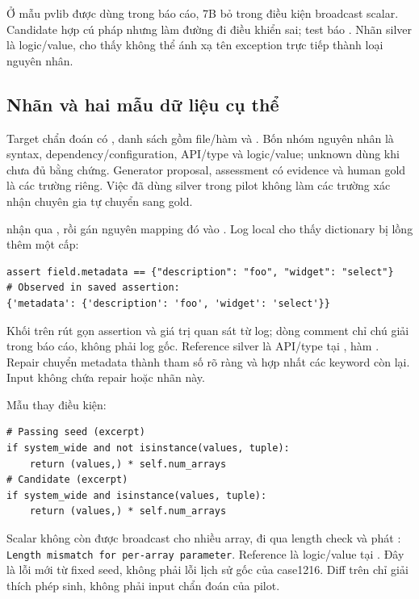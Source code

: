 \documentclass[12pt,a4paper]{article}
\begin{document}
Ở mẫu pvlib được dùng trong báo cáo, 7B bỏ  trong điều kiện broadcast scalar. Candidate hợp cú pháp nhưng làm đường đi điều khiển sai; test báo . Nhãn silver là logic/value, cho thấy không thể ánh xạ tên exception trực tiếp thành loại nguyên nhân.

\nextpage
\subsection{Nhãn và hai mẫu dữ liệu cụ thể}
Target chẩn đoán có , danh sách  gồm file/hàm và . Bốn nhóm nguyên nhân là syntax, dependency/configuration, API/type và logic/value; unknown dùng khi chưa đủ bằng chứng. Generator proposal, assessment có evidence và human gold là các trường riêng. Việc đã dùng silver trong pilot không làm các trường xác nhận chuyên gia tự chuyển sang gold.

 nhận  qua , rồi gán nguyên mapping đó vào . Log local cho thấy dictionary bị lồng thêm một cấp:
\begin{Verbatim}[fontsize=\footnotesize]
assert field.metadata == {"description": "foo", "widget": "select"}
# Observed in saved assertion:
{'metadata': {'description': 'foo', 'widget': 'select'}}
\end{Verbatim}
Khối trên rút gọn assertion và giá trị quan sát từ log; dòng comment chỉ chú giải trong báo cáo, không phải log gốc. Reference silver là API/type tại , hàm . Repair chuyển metadata thành tham số rõ ràng và hợp nhất các keyword còn lại. Input không chứa repair hoặc nhãn này.

Mẫu  thay điều kiện:
\begin{Verbatim}[fontsize=\small]
# Passing seed (excerpt)
if system_wide and not isinstance(values, tuple):
    return (values,) * self.num_arrays
# Candidate (excerpt)
if system_wide and isinstance(values, tuple):
    return (values,) * self.num_arrays
\end{Verbatim}
Scalar không còn được broadcast cho nhiều array, đi qua length check và phát : \texttt{Length mismatch for per-array parameter}. Reference là logic/value tại . Đây là lỗi mới từ fixed seed, không phải lỗi lịch sử gốc của case1216. Diff trên chỉ giải thích phép sinh, không phải input chẩn đoán của pilot.
\end{document}
